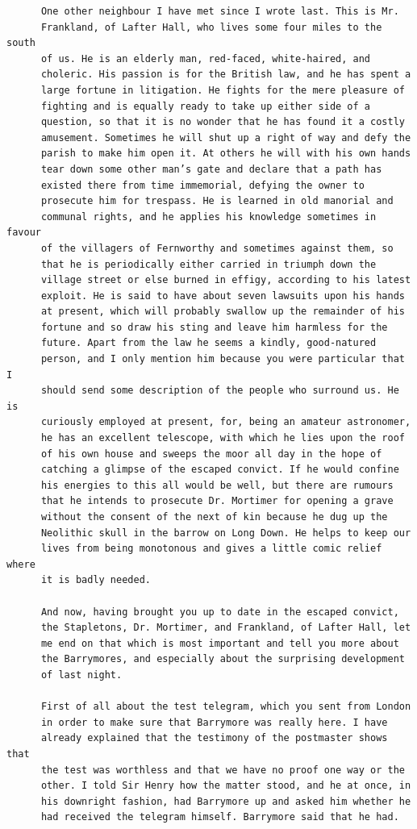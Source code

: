 \documentclass{article}
\begin{document}
\begin{verbatim}
      One other neighbour I have met since I wrote last. This is Mr.
      Frankland, of Lafter Hall, who lives some four miles to the south
      of us. He is an elderly man, red-faced, white-haired, and
      choleric. His passion is for the British law, and he has spent a
      large fortune in litigation. He fights for the mere pleasure of
      fighting and is equally ready to take up either side of a
      question, so that it is no wonder that he has found it a costly
      amusement. Sometimes he will shut up a right of way and defy the
      parish to make him open it. At others he will with his own hands
      tear down some other man’s gate and declare that a path has
      existed there from time immemorial, defying the owner to
      prosecute him for trespass. He is learned in old manorial and
      communal rights, and he applies his knowledge sometimes in favour
      of the villagers of Fernworthy and sometimes against them, so
      that he is periodically either carried in triumph down the
      village street or else burned in effigy, according to his latest
      exploit. He is said to have about seven lawsuits upon his hands
      at present, which will probably swallow up the remainder of his
      fortune and so draw his sting and leave him harmless for the
      future. Apart from the law he seems a kindly, good-natured
      person, and I only mention him because you were particular that I
      should send some description of the people who surround us. He is
      curiously employed at present, for, being an amateur astronomer,
      he has an excellent telescope, with which he lies upon the roof
      of his own house and sweeps the moor all day in the hope of
      catching a glimpse of the escaped convict. If he would confine
      his energies to this all would be well, but there are rumours
      that he intends to prosecute Dr. Mortimer for opening a grave
      without the consent of the next of kin because he dug up the
      Neolithic skull in the barrow on Long Down. He helps to keep our
      lives from being monotonous and gives a little comic relief where
      it is badly needed.

      And now, having brought you up to date in the escaped convict,
      the Stapletons, Dr. Mortimer, and Frankland, of Lafter Hall, let
      me end on that which is most important and tell you more about
      the Barrymores, and especially about the surprising development
      of last night.

      First of all about the test telegram, which you sent from London
      in order to make sure that Barrymore was really here. I have
      already explained that the testimony of the postmaster shows that
      the test was worthless and that we have no proof one way or the
      other. I told Sir Henry how the matter stood, and he at once, in
      his downright fashion, had Barrymore up and asked him whether he
      had received the telegram himself. Barrymore said that he had.


\end{verbatim}
\end{document}
